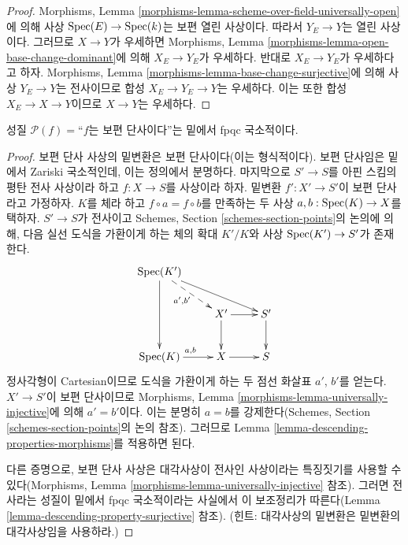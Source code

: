 \begin{proof}
Morphisms, Lemma
\ref{morphisms-lemma-scheme-over-field-universally-open}에 의해 사상
$\mathop{\mathrm{Spec}}(E) \to \mathop{\mathrm{Spec}}(k)$는 보편 열린 사상이다. 따라서 $Y_E \to Y$는
열린 사상이다. 그러므로 $X \to Y$가 우세하면 Morphisms, Lemma
\ref{morphisms-lemma-open-base-change-dominant}에 의해
$X_E \to Y_E$가 우세하다. 반대로 $X_E \to Y_E$가 우세하다고 하자.
Morphisms, Lemma \ref{morphisms-lemma-base-change-surjective}에 의해
사상 $Y_E \to Y$는 전사이므로 합성 $X_E \to Y_E \to Y$는 우세하다.
이는 또한 합성 $X_E \to X \to Y$이므로 $X \to Y$는 우세하다.
\end{proof}

\begin{lemma}
\label{lemma-descending-property-universally-injective}
성질 $\mathcal{P}(f) =$“$f$는 보편 단사이다”는 밑에서 fpqc 국소적이다.
\end{lemma}

\begin{proof}
보편 단사 사상의 밑변환은 보편 단사이다(이는 형식적이다). 보편
단사임은 밑에서 Zariski 국소적인데, 이는 정의에서 분명하다. 마지막으로
$S' \to S$를 아핀 스킴의 평탄 전사 사상이라 하고 $f : X \to S$를
사상이라 하자. 밑변환 $f' : X' \to S'$이 보편 단사라고 가정하자.
$K$를 체라 하고 $f \circ a = f \circ b$를 만족하는 두 사상
$a, b : \mathop{\mathrm{Spec}}(K) \to X$를 택하자. $S' \to S$가 전사이고 Schemes,
Section \ref{schemes-section-points}의 논의에 의해, 다음 실선 도식을
가환이게 하는 체의 확대 $K'/K$와 사상 $\mathop{\mathrm{Spec}}(K')
\to S'$가 존재한다.
$$
\xymatrix{
\Spec(K') \ar[rrd] \ar@{-->}[rd]_{a', b'} \ar[dd] \\
 &
X' \ar[r] \ar[d] &
S' \ar[d] \\
\Spec(K) \ar[r]^{a, b} &
X \ar[r] &
S
}
$$
정사각형이 Cartesian이므로 도식을 가환이게 하는 두 점선 화살표 $a'$,
$b'$를 얻는다. $X' \to S'$이 보편 단사이므로 Morphisms, Lemma
\ref{morphisms-lemma-universally-injective}에 의해 $a' = b'$이다. 이는
분명히 $a = b$를 강제한다(Schemes, Section
\ref{schemes-section-points}의 논의 참조). 그러므로 Lemma
\ref{lemma-descending-properties-morphisms}를 적용하면 된다.

\medskip\noindent
다른 증명으로, 보편 단사 사상은 대각사상이 전사인 사상이라는 특징짓기를
사용할 수 있다(Morphisms, Lemma
\ref{morphisms-lemma-universally-injective} 참조). 그러면 전사라는
성질이 밑에서 fpqc 국소적이라는 사실에서 이 보조정리가 따른다(Lemma
\ref{lemma-descending-property-surjective} 참조). (힌트: 대각사상의
밑변환은 밑변환의 대각사상임을 사용하라.)
\end{proof}

